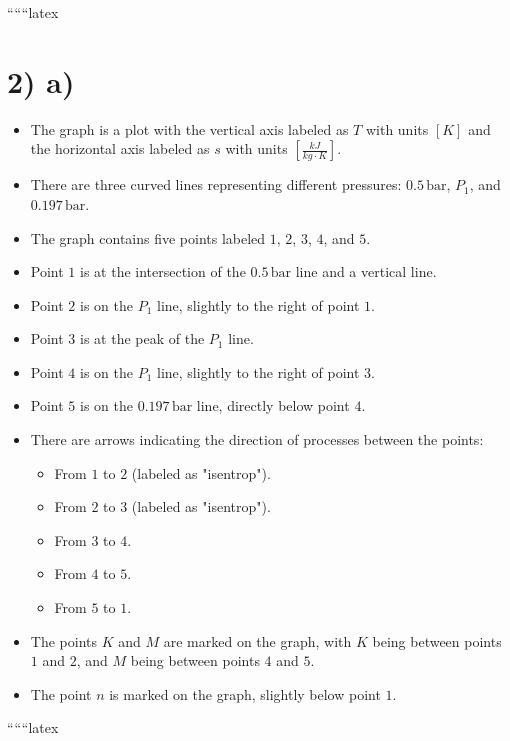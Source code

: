 
``````latex


\section*{2) a)}

\begin{itemize}
    \item The graph is a plot with the vertical axis labeled as \( T \) with units \([K]\) and the horizontal axis labeled as \( s \) with units \(\left[\frac{kJ}{kg \cdot K}\right]\).
    \item There are three curved lines representing different pressures: \(0.5 \, \text{bar}\), \(P_1\), and \(0.197 \, \text{bar}\).
    \item The graph contains five points labeled \(1\), \(2\), \(3\), \(4\), and \(5\).
    \item Point \(1\) is at the intersection of the \(0.5 \, \text{bar}\) line and a vertical line.
    \item Point \(2\) is on the \(P_1\) line, slightly to the right of point \(1\).
    \item Point \(3\) is at the peak of the \(P_1\) line.
    \item Point \(4\) is on the \(P_1\) line, slightly to the right of point \(3\).
    \item Point \(5\) is on the \(0.197 \, \text{bar}\) line, directly below point \(4\).
    \item There are arrows indicating the direction of processes between the points: 
        \begin{itemize}
            \item From \(1\) to \(2\) (labeled as "isentrop").
            \item From \(2\) to \(3\) (labeled as "isentrop").
            \item From \(3\) to \(4\).
            \item From \(4\) to \(5\).
            \item From \(5\) to \(1\).
        \end{itemize}
    \item The points \(K\) and \(M\) are marked on the graph, with \(K\) being between points \(1\) and \(2\), and \(M\) being between points \(4\) and \(5\).
    \item The point \(n\) is marked on the graph, slightly below point \(1\).
\end{itemize}

``````latex


